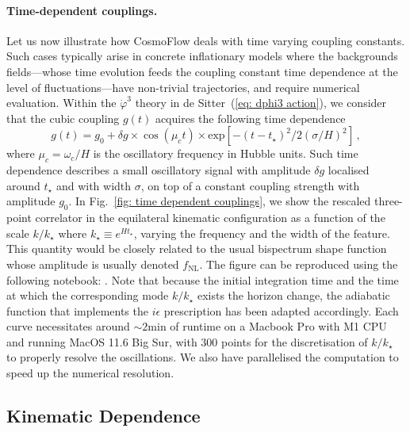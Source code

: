 \documentclass[11pt]{article}
\numberwithin{equation}{section} %
\begin{document}
\paragraph{Time-dependent couplings.} Let us now illustrate how \textsf{CosmoFlow} deals with time varying coupling constants. Such cases typically arise in concrete inflationary models where the backgrounds fields---whose time evolution feeds the coupling constant time dependence at the level of fluctuations---have non-trivial trajectories, and require numerical evaluation. Within the $\dot{\varphi}^3$ theory in de Sitter~(\ref{eq: dphi3 action}), we consider that the cubic coupling $g(t)$ acquires the following time dependence
\begin{equation}
    g(t) = g_0 + \delta g \times \cos\left(\mu_c t\right) \times \text{exp}\left[-(t - t_\star)^2/2(\sigma/H)^2\right]\,,
\end{equation}
where $\mu_c = \omega_c/H$ is the oscillatory frequency in Hubble units. Such time dependence describes a small oscillatory signal with amplitude $\delta g$ localised around $t_\star$ and with width $\sigma$, on top of a constant coupling strength with amplitude $g_0$. In Fig.~\ref{fig: time dependent couplings}, we show the rescaled three-point correlator in the equilateral kinematic configuration as a function of the scale $k/k_\star$ where $k_\star \equiv e^{Ht_\star}$, varying the frequency and the width of the feature. This quantity would be closely related to the usual bispectrum shape function whose amplitude is usually denoted $f_{\text{NL}}$. The figure can be reproduced using the following notebook: \href{https://github.com/deniswerth/CosmoFlow/blob/main/CosmoFlow/Massless_dphi3/TimeDependentCouplings.ipynb}{\faGithub}. Note that because the initial integration time and the time at which the corresponding mode $k/k_\star$ exists the horizon change, the \textsf{adiabatic} function that implements the $i\epsilon$ prescription has been adapted accordingly. Each curve necessitates around $\sim2$min of runtime on a Macbook Pro with M1 CPU and running MacOS 11.6 Big Sur, with $300$ points for the discretisation of $k/k_\star$ to properly resolve the oscillations. We also have parallelised the computation to speed up the numerical resolution. 



\subsection{Kinematic Dependence}
\end{document}
